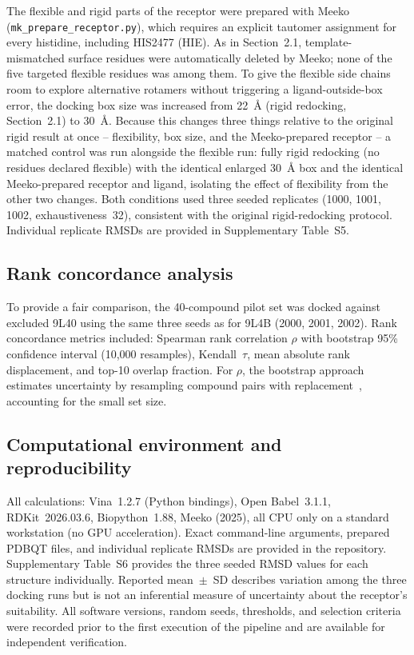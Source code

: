 \documentclass[global,twocolumn]{svjour}
\begin{document}
The flexible and rigid parts of the receptor were prepared with Meeko
(\texttt{mk\_prepare\_receptor.py}), which requires an explicit tautomer
assignment for every histidine, including HIS2477 (HIE). As in
Section~2.1, template-mismatched surface residues were automatically
deleted by Meeko; none of the five targeted flexible residues was among
them. To give the flexible side chains room to explore alternative rotamers
without triggering a ligand-outside-box error, the docking box size was
increased from 22~\AA{} (rigid redocking, Section~2.1) to 30~\AA{}. Because
this changes three things relative to the original rigid result at once --
flexibility, box size, and the Meeko-prepared receptor -- a matched control
was run alongside the flexible run: fully rigid redocking (no residues
declared flexible) with the identical enlarged 30~\AA{} box and the
identical Meeko-prepared receptor and ligand, isolating the effect of
flexibility from the other two changes. Both conditions used three seeded
replicates (1000, 1001, 1002, exhaustiveness~32), consistent with the
original rigid-redocking protocol. Individual replicate RMSDs are provided
in Supplementary Table~S5.

\subsection{Rank concordance analysis}

To provide a fair comparison, the 40-compound pilot set was docked against
excluded 9L40 using the same three seeds as for 9L4B (2000, 2001, 2002).
Rank concordance metrics included: Spearman rank correlation $\rho$ with
bootstrap 95\% confidence interval (10,000 resamples), Kendall~$\tau$,
mean absolute rank displacement, and top-10 overlap fraction. For $\rho$,
the bootstrap approach estimates uncertainty by resampling compound pairs
with replacement~\cite{efron1993}, accounting for the small set size.

\subsection{Computational environment and reproducibility}

All calculations: Vina~1.2.7 (Python bindings), Open Babel~3.1.1,
RDKit~2026.03.6, Biopython~1.88, Meeko (2025), all CPU only on a standard
workstation (no GPU acceleration). Exact command-line arguments, prepared
PDBQT files, and individual replicate RMSDs are provided in the repository.
Supplementary Table~S6 provides the three seeded RMSD values for each
structure individually. Reported mean~$\pm$~SD describes variation among
the three docking runs but is not an inferential measure of uncertainty
about the receptor's suitability. All software versions, random seeds,
thresholds, and selection criteria were recorded prior to the first
execution of the pipeline and are available for independent verification.
\end{document}
